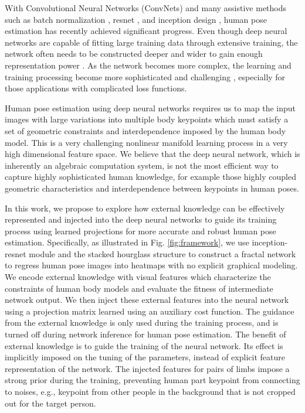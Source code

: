 \documentclass[journal ]{IEEEtran}
\begin{document}
With Convolutional Neural Networks (ConvNets) and many assistive methods such as batch normalization \cite{ioffe2015batch}, resnet \cite{he2016deep}, and inception design \cite{szegedy2015going, szegedy2016rethinking}, human pose estimation has recently achieved significant progress.
Even though deep neural networks are capable of fitting large training data through extensive training, the network often needs to be constructed deeper and wider to gain enough representation power \cite{ba2014deep}. As the network becomes more complex, the learning and training processing become more sophisticated and challenging \cite{romero2014fitnets}, especially for those applications with complicated loss functions.

Human pose estimation using deep neural networks requires us to map the input images with large variations into multiple body keypoints which must satisfy a set of geometric constraints and interdependence imposed by the human body model. This is a very challenging nonlinear manifold learning process in a very high dimensional feature space. 
We believe that the deep neural network, which is inherently an algebraic computation system, is not the most efficient way to capture highly sophisticated human knowledge, for example those highly coupled geometric characteristics and interdependence between keypoints in human poses. 

In this work, we propose to explore how external knowledge can be effectively represented and injected into the deep neural networks to guide its training process using learned projections for more accurate and robust human pose estimation. Specifically, as illustrated in Fig. \ref{fig:framework}, we use inception-resnet module and the stacked hourglass structure to construct a fractal network to regress human pose images into heatmaps with no explicit graphical modeling. 
We encode external knowledge with visual features which characterize the constraints of human body models and evaluate the fitness of intermediate network output. We then inject these external features into the neural network using a projection matrix learned using an auxiliary cost function.
The guidance from the external knowledge is only used during the training process, and is turned off during network inference for human pose estimation. 
The benefit of external knowledge is to guide the training of the neural network. Its effect is implicitly imposed on the tuning of the parameters, instead of explicit feature representation of the network.
The injected features for pairs of limbs impose a strong prior during the training, preventing human part keypoint from connecting to noises, e.g., keypoint from other people in the background that is not cropped out for the target person.
\end{document}
